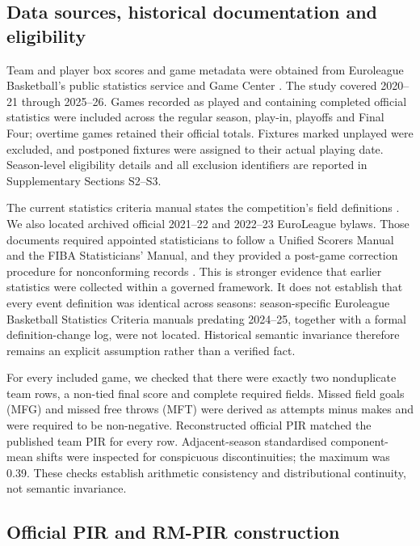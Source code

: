 \documentclass[pdflatex,sn-mathphys-num]{sn-jnl}
\begin{document}
\subsection{Data sources, historical documentation and eligibility}

Team and player box scores and game metadata were obtained from Euroleague Basketball's public statistics service and Game Center \cite{euroleagueStats,EuroleagueGameCenter2026}. The study covered 2020--21 through 2025--26. Games recorded as played and containing completed official statistics were included across the regular season, play-in, playoffs and Final Four; overtime games retained their official totals. Fixtures marked unplayed were excluded, and postponed fixtures were assigned to their actual playing date. Season-level eligibility details and all exclusion identifiers are reported in Supplementary Sections S2--S3.

The current statistics criteria manual states the competition's field definitions \cite{EuroleagueStatsManual2025}. We also located archived official 2021--22 and 2022--23 EuroLeague bylaws. Those documents required appointed statisticians to follow a Unified Scorers Manual and the FIBA Statisticians' Manual, and they provided a post-game correction procedure for nonconforming records \cite{EuroleagueBylaws2021,EuroleagueBylaws2022,FIBAStatisticiansManual2024}. This is stronger evidence that earlier statistics were collected within a governed framework. It does not establish that every event definition was identical across seasons: season-specific Euroleague Basketball Statistics Criteria manuals predating 2024--25, together with a formal definition-change log, were not located. Historical semantic invariance therefore remains an explicit assumption rather than a verified fact.

For every included game, we checked that there were exactly two nonduplicate team rows, a non-tied final score and complete required fields. Missed field goals (MFG) and missed free throws (MFT) were derived as attempts minus makes and were required to be non-negative. Reconstructed official PIR matched the published team PIR for every row. Adjacent-season standardised component-mean shifts were inspected for conspicuous discontinuities; the maximum was 0.39. These checks establish arithmetic consistency and distributional continuity, not semantic invariance.

\subsection{Official PIR and RM-PIR construction}
\end{document}
